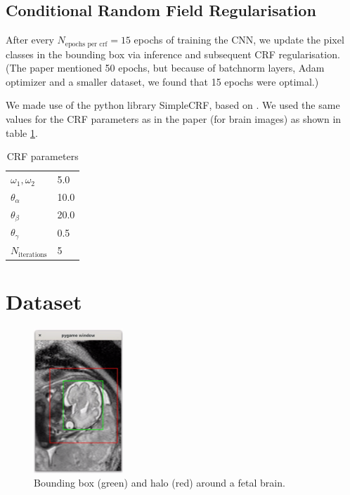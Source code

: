 \documentclass[a4paper]{article}
\begin{document}
\subsection{Conditional Random Field Regularisation}
After every $N_{\text{epochs per crf}} = 15$ epochs of training the CNN, we
update the pixel classes in the bounding box via inference and subsequent CRF
regularisation. (The paper mentioned 50 epochs, but because of batchnorm layers,
Adam optimizer and a smaller dataset, we found that 15 epochs were optimal.)

We made use of the python library SimpleCRF, based on \cite{crf-inference}.  We
used the same values for the CRF parameters as in the paper \cite{deepcut} (for
brain images) as shown in table \ref{tab:crf-params}.

\begin{table}
    \centering
    \begin{tabular}{l l}
        \toprule
        $\omega_1, \omega_2$ & 5.0 \\
        $\theta_{\alpha}$ & 10.0 \\
        $\theta_{\beta}$ & 20.0 \\
        $\theta_{\gamma}$ & 0.5 \\
        $N_{\text{iterations}}$ & 5 \\
        \bottomrule
    \end{tabular}
    \caption{CRF parameters}
    \label{tab:crf-params}
\end{table}

\section{Dataset}
\begin{figure}[h!]
    \centering
    \includegraphics[width=0.3\textwidth]{figures/annotating.png}
    \caption{Bounding box (green) and halo (red) around a fetal brain.}
\end{figure}
\end{document}
